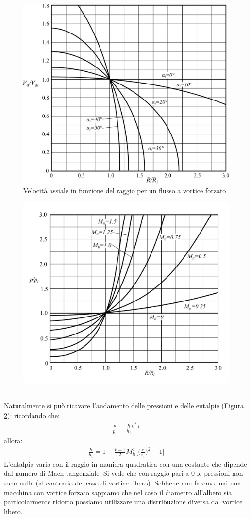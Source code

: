 \begin{figure}
\centering
  \includegraphics[width=.8\textwidth]{fig/VortForz.pdf}
\caption{Velocità assiale in funzione del raggio per un flusso a vortice forzato}
\label{fig:TurboFan}
\end{figure}
\begin{figure}
\centering
  \includegraphics[width=.8\textwidth]{fig/PVortForz.pdf}
\caption{}
\label{fig:PVortForz}
\end{figure}
\\Naturalmente si può ricavare l'andamento delle pressioni e delle entalpie (Figura \ref{fig:PVortForz}); ricordando che:
\begin{align*}
\frac{p}{p_i} = \frac{h}{h_i}^{\frac{k}{k-1}}
\end{align*}
allora:
\begin{align*}
\frac{h}{h_i} = 1 + \frac{k-1}{2} M_{ti}^2 \bigg[ \bigg(\frac{r}{r_i} \bigg)^2-1 \bigg]
\end{align*}
L'entalpia varia con il raggio in maniera quadratica con una costante che dipende dal numero di Mach tangenziale. Si vede che con raggio pari a $0$ le pressioni non sono nulle (al contrario del caso di vortice libero). Sebbene non faremo mai una macchina con vortice forzato sappiamo che nel caso il diametro all'albero sia particolarmente ridotto possiamo utilizzare una distribuzione diversa dal vortice libero. 
